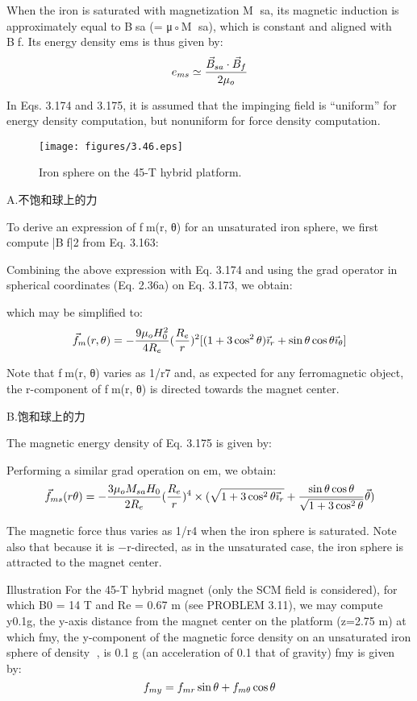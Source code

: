 When the iron is saturated with magnetization M sa, its magnetic induction is
approximately equal to Bsa (= μ◦M sa), which is constant and aligned with Bf.
Its energy density ems is thus given by:
$$
e_{ms}\simeq\frac{\vec{B}_{sa}\cdot\vec{B}_{f}}{2\mu_{o}}\\%
$$

In Eqs. 3.174 and 3.175, it is assumed that the impinging field is “uniform” for
energy density computation, but nonuniform for force density computation.

\begin{figure}[htbp]
	\centering
	\texttt{[image: figures/3.46.eps]}
	\caption{Iron sphere on the 45-T hybrid platform.}
\end{figure}

A.不饱和球上的力

To derive an expression of fm(r, θ) for an unsaturated iron sphere, we first compute
|Bf|2 from Eq. 3.163:

Combining the above expression with Eq. 3.174 and using the grad operator in
spherical coordinates (Eq. 2.36a) on Eq. 3.173, we obtain:

which may be simplified to:
$$
\vec{f}_{m}(r,\theta)=-\frac{9\mu_{o}H_{0}^{2}}{4R_{e}}(\frac{R_{e}}{r})^{2}[(1+3\cos^{2}\theta)\vec{\imath}_{r}+\sin\theta\cos\theta\vec{\imath}_{\theta}]\\%
$$

Note that fm(r, θ) varies as 1/r7 and, as expected for any ferromagnetic object,
the r-component of fm(r, θ) is directed towards the magnet center.

B.饱和球上的力

The magnetic energy density of Eq. 3.175 is given by:

Performing a similar grad operation on em, we obtain:
$$
\vec{f}_{ms}(r\theta)=-\frac{3\mu_{o}M_{sa}H_{0}}{2R_{e}}(\frac{R_{e}}{r})^{4}\\
\times(\sqrt{1+3\cos^{2}\theta\vec{\imath}_{r}}+\frac{\sin\theta\cos\theta}{\sqrt{1+3\cos^{2}\theta}}\vec{\theta})\\%
$$

The magnetic force thus varies as 1/r4 when the iron sphere is saturated. Note
also that because it is −r-directed, as in the unsaturated case, the iron sphere is
attracted to the magnet center.

Illustration For the 45-T hybrid magnet (only the SCM field is considered), for
which B0 = 14 T and Re = 0.67 m (see PROBLEM 3.11), we may compute y0.1g,
the y-axis distance from the magnet center on the platform (z=2.75 m) at which
fmy, the y-component of the magnetic force density on an unsaturated iron sphere
of density , is 0.1g (an acceleration of 0.1 that of gravity) fmy is given by:
$$
f_{my}=f_{mr}\sin\theta+f_{m\theta}\cos\theta\\%
$$

